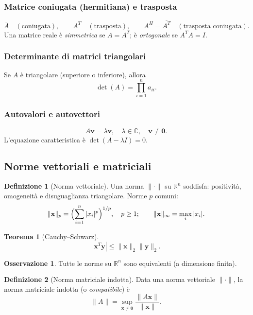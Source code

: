 \documentclass[12pt,a4paper]{article}
\theoremstyle{definition}
\newtheorem{definizione}{Definizione}[section]
\newtheorem{teorema}{Teorema}[section]
\newtheorem{osservazione}{Osservazione}[section]
\begin{document}
\subsubsection{Matrice coniugata (hermitiana) e trasposta}
\[
  \bar{A} \quad (\text{coniugata}), \qquad A^T \quad (\text{trasposta}), \qquad A^H = \overline{A^T} \quad (\text{trasposta coniugata}).
\]
Una matrice reale è \emph{simmetrica} se $A = A^T$; è \emph{ortogonale} se $A^T A = I$.

\subsubsection{Determinante di matrici triangolari}
Se $A$ è triangolare (superiore o inferiore), allora
\[
  \det(A) = \prod_{i=1}^{n} a_{ii}.
\]

\subsubsection{Autovalori e autovettori}
\[
  A\mathbf{v} = \lambda\mathbf{v}, \quad \lambda \in \mathbb{C}, \quad \mathbf{v} \neq \mathbf{0}.
\]
L'equazione caratteristica è $\det(A - \lambda I) = 0$.

\subsection{Norme vettoriali e matriciali}

\begin{definizione}[Norma vettoriale]
Una norma $\|\cdot\|$ su $\mathbb{R}^n$ soddisfa:
positività, omogeneità e disuguaglianza triangolare.
Norme $p$ comuni:
\[
  \|\mathbf{x}\|_p = \Bigl(\sum_{i=1}^n |x_i|^p\Bigr)^{1/p}, \quad p \geq 1; \qquad
  \|\mathbf{x}\|_\infty = \max_i |x_i|.
\]
\end{definizione}

\begin{teorema}[Cauchy--Schwarz]
\[
  |\mathbf{x}^T \mathbf{y}| \leq \|\mathbf{x}\|_2 \|\mathbf{y}\|_2.
\]
\end{teorema}

\begin{osservazione}
Tutte le norme su $\mathbb{R}^n$ sono equivalenti (a dimensione finita).
\end{osservazione}

\begin{definizione}[Norma matriciale indotta]
Data una norma vettoriale $\|\cdot\|$, la norma matriciale indotta (o \emph{compatibile}) è
\[
  \|A\| = \sup_{\mathbf{x} \neq \mathbf{0}} \frac{\|A\mathbf{x}\|}{\|\mathbf{x}\|}.
\]
\end{definizione}
\end{document}
